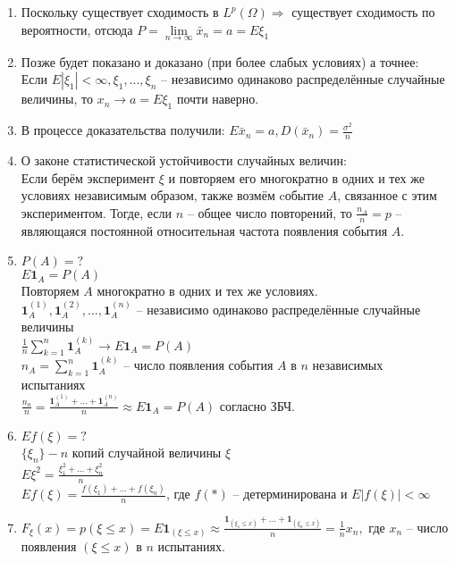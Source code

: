\begin{corollary}
\begin{enumerate}
\item Поскольку существует сходимость в $L^p(\Omega)\Rightarrow$ существует сходимость по вероятности, отсюда $P=\lim\limits_{n\rightarrow\infty}\bar{x}_n=a=E\xi_1$
\item Позже будет показано и доказано (при более слабых условиях) а точнее:\\
Если $E|\xi_1|<\infty, \xi_1,...,\xi_n$ -- независимо одинаково распределённые случайные величины, то $x_n\rightarrow a=E\xi_1$ почти наверно.
\item В процессе доказательства получили: $E\bar{x}_n = a, D(\bar{x}_n) = \frac{\sigma^2}{n}$
\item О законе статистической устойчивости случайных величин:\\
Если берём эксперимент $\xi$ и повторяем его многократно в одних и тех же условиях независимым образом, также возмём cобытие $A$, связанное с этим экспериментом. Тогде, если $n$ -- общее число повторений, то $\frac{n_A}{n}=p$ -- являющаяся постоянной относительная частота появления события $A$.
\item $P(A)=?$\\
$E\textbf{1}_A=P(A)$\\
Повторяем $A$ многократно в одних и тех же условиях.\\
$\textbf{1}_A^{(1)}, \textbf{1}_A^{(2)},...,\textbf{1}_A^{(n)}$ -- независимо одинаково распределённые случайные величины\\
$\frac{1}{n}\sum\limits_{k=1}^n \textbf{1}_A^{(k)}\rightarrow E\textbf{1}_A = P(A)$\\
$n_A=\sum\limits_{k=1}^n \textbf{1}_A^{(k)}$ -- число появления события $A$ в $n$ независимых испытаниях\\
$\frac{n_a}{n}=\frac{\textbf{1}_A^{(1)}+...+\textbf{1}_A^{(n)}}{n}\approx E\textbf{1}_A = P(A)$ согласно ЗБЧ.
\item $Ef(\xi)=?$\\
$\{\xi_{n}\} - n$ копий случайной величины $\xi$\\
$E\xi^{2} = \frac{\xi_{1}^{2}+...+\xi_{n}^{2}}{n}$\\
$Ef(\xi) = \frac{f(\xi_{1})+...+f(\xi_{n})}{n}$, где $f(*)$ -- детерминирована и $E|f(\xi)| < \infty$
\item $F_{\xi}(x) = p(\xi \leq x) = E\textbf{1}_{(\xi \leq x)} \approx \frac{\textbf{1}_{(\xi_{1} \leq x)} +...+\textbf{1}_{(\xi_{n} \leq x)}}{n} = \frac{1}{n}x_{n},$ где $x_{n}$ -- число появления $(\xi \leq x)$ в $n$ испытаниях.\\

\end{enumerate}
\end{corollary}
